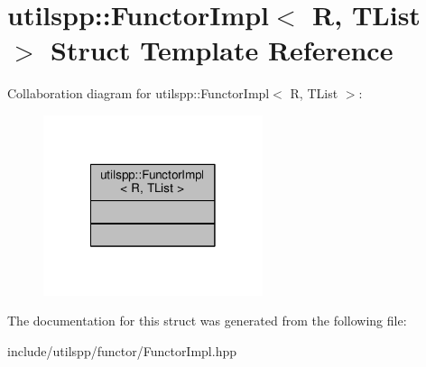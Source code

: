 \hypertarget{structutilspp_1_1FunctorImpl}{\section{utilspp\-:\-:Functor\-Impl$<$ R, T\-List $>$ Struct Template Reference}
\label{structutilspp_1_1FunctorImpl}
}


Collaboration diagram for utilspp\-:\-:Functor\-Impl$<$ R, T\-List $>$\-:\nopagebreak
\begin{figure}[H]
\begin{center}
\leavevmode
\includegraphics[width=182pt]{structutilspp_1_1FunctorImpl__coll__graph}
\end{center}
\end{figure}


The documentation for this struct was generated from the following file\-:\begin{DoxyCompactItemize}
\item 
include/utilspp/functor/Functor\-Impl.\-hpp\end{DoxyCompactItemize}
